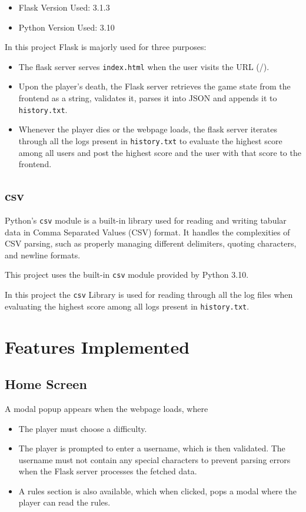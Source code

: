 \documentclass{article}
\begin{document}
    \begin{itemize}
        \item Flask Version Used: 3.1.3
        \item Python Version Used: 3.10
    \end{itemize}
    In this project Flask is majorly used for three purposes:
    \begin{itemize}
        \item The flask server serves \texttt{index.html} when the user visits the URL (/).
        \item Upon the player’s death, the Flask server retrieves the game state from the frontend as a string, validates it, parses it into JSON and appends it to \texttt{history.txt}.
        \item Whenever the player dies or the webpage loads, the flask server iterates through all the logs present in \texttt{history.txt} to evaluate the highest score among all users and post the highest score and the user with that score to the frontend.
    \end{itemize}

    \subsection{csv}
    Python's \texttt{csv} \cite{csv}module is a built-in library used for reading and writing tabular data in Comma Separated Values (CSV) format. It handles the complexities of CSV parsing, such as properly managing different delimiters, quoting characters, and newline formats.
    
    This project uses the built-in \texttt{csv} module provided by Python 3.10.
    
    In this project the \texttt{csv} Library is used for reading through all the log files when evaluating the highest score among all logs present in \texttt{history.txt}.

    \section{Features Implemented}
    \subsection{Home Screen}
    A modal popup appears when the webpage loads, where 
    \begin{itemize}
        \item The player must choose a difficulty.
        \item The player is prompted to enter a username, which is then validated. The username must not contain any special characters to prevent parsing errors when the Flask server processes the fetched data.
        \item A rules section is also available, which when clicked, pops a modal where the player can read the rules.
    \end{itemize}
\end{document}
